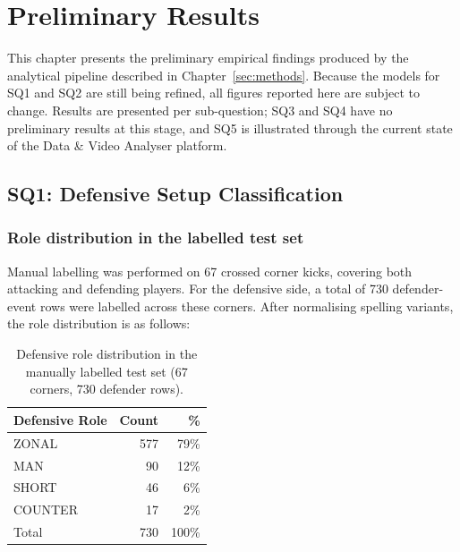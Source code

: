 
\chapter{Preliminary Results}
\label{ch:results}

This chapter presents the preliminary empirical findings produced by the
analytical pipeline described in Chapter~\ref{sec:methods}. Because the
models for SQ1 and SQ2 are still being refined, all figures reported here
are subject to change. Results are presented per sub-question; SQ3 and SQ4
have no preliminary results at this stage, and SQ5 is illustrated through
the current state of the Data \& Video Analyser platform.

\section{SQ1: Defensive Setup Classification}
\label{sec:results_sq1}

\subsection{Role distribution in the labelled test set}

Manual labelling was performed on 67 crossed corner kicks, covering both
attacking and defending players. For the defensive side, a total of
730 defender-event rows were labelled across these corners. After
normalising spelling variants, the role distribution is as follows:

\begin{table}[h]
  \centering
  \caption{Defensive role distribution in the manually labelled test
           set (67 corners, 730 defender rows).}
  \label{tab:sq1_role_dist}
  \begin{tabular}{lrr}
    \toprule
    \textbf{Defensive Role} & \textbf{Count} & \textbf{\%} \\
    \midrule
    ZONAL    & 577 & 79\% \\
    MAN      &  90 & 12\% \\
    SHORT    &  46 &  6\% \\
    COUNTER  &  17 &  2\% \\
    \midrule
    Total    & 730 & 100\% \\
    \bottomrule
  \end{tabular}
\end{table}

